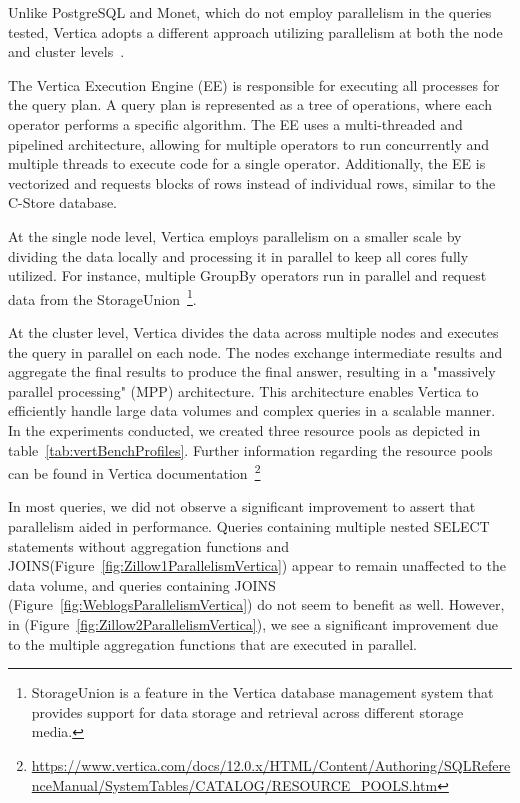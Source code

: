 Unlike PostgreSQL and Monet, which do not employ parallelism in the queries tested, Vertica adopts a different 
approach utilizing parallelism at both the node and cluster levels~\cite{LFVT12}.

The Vertica Execution Engine (EE) is responsible for executing all processes for the query plan. 
A query plan is represented as a tree of operations, where each operator performs a specific algorithm. 
The EE uses a multi-threaded and pipelined architecture, allowing for multiple operators to run 
concurrently and multiple threads to execute code for a single operator. Additionally, the EE is 
vectorized and requests blocks of rows instead of individual rows, similar to the C-Store database.

At the single node level, Vertica employs parallelism on a smaller scale by dividing the data locally 
and processing it in parallel to keep all cores fully utilized. For instance, multiple GroupBy operators 
run in parallel and request data from the StorageUnion~\footnote{StorageUnion is a feature in the Vertica 
database management system that provides support for data storage and retrieval across different storage media.}.

At the cluster level, Vertica divides the data across multiple nodes and executes the query in parallel 
on each node. The nodes exchange intermediate results and aggregate the final results to produce the 
final answer, resulting in a "massively parallel processing" (MPP) architecture. This architecture enables 
Vertica to efficiently handle large data volumes and complex queries in a scalable manner. In the experiments 
conducted, we created three resource pools as depicted in table~\ref{tab:vertBenchProfiles}. 
Further information regarding the resource pools can be found in Vertica 
documentation~\footnote{\url{https://www.vertica.com/docs/12.0.x/HTML/Content/Authoring/SQLReferenceManual/SystemTables/CATALOG/RESOURCE_POOLS.htm}}

In most queries, we did not observe a significant improvement to assert that parallelism aided in performance. 
Queries containing multiple nested SELECT statements without aggregation functions and JOINS(Figure~\ref{fig:Zillow1ParallelismVertica}) 
appear to remain unaffected to the data volume, and queries containing JOINS (Figure~\ref{fig:WeblogsParallelismVertica}) 
do not seem to benefit as well.
However, in (Figure~\ref{fig:Zillow2ParallelismVertica}), 
we see a significant improvement due to the multiple aggregation functions that are executed in parallel.

